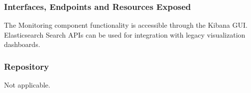 \subsubsection{Interfaces, Endpoints and Resources Exposed}
The Monitoring component functionality is accessible through the Kibana GUI. Elasticsearch Search APIs can be used for integration with legacy visualization dashboards. 
\subsubsection{Repository}
Not applicable.
